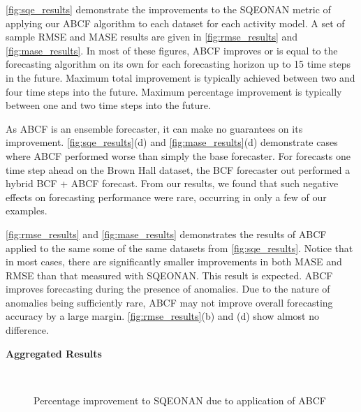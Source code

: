 \ref{fig:sqe_results} demonstrate the improvements to the SQEONAN metric of applying our ABCF algorithm to each dataset for each activity model.  A set of sample RMSE and MASE results are given in \ref{fig:rmse_results} and \ref{fig:mase_results}.  In most of these figures, ABCF improves or is equal to the forecasting algorithm on its own for each forecasting horizon up to 15 time steps in the future.  Maximum total improvement is typically achieved between two and four time steps into the future.  Maximum percentage improvement is typically between one and two time steps into the future.

As ABCF is an ensemble forecaster, it can make no guarantees on its improvement.  \ref{fig:sqe_results}(d) and \ref{fig:mase_results}(d) demonstrate cases where ABCF performed worse than simply the base forecaster.  For forecasts one time step ahead on the Brown Hall dataset, the BCF forecaster out performed a hybrid BCF + ABCF forecast.  From our results, we found that such negative effects on forecasting performance were rare, occurring in only a few of our examples.

\ref{fig:rmse_results} and \ref{fig:mase_results} demonstrates the results of ABCF applied to the same some of the same datasets from \ref{fig:sqe_results}.  Notice that in most cases, there are significantly smaller improvements in both MASE and RMSE than that measured with SQEONAN.  This result is expected.  ABCF improves forecasting during the presence of anomalies.  Due to the nature of anomalies being sufficiently rare, ABCF may not improve overall forecasting accuracy by a large margin.  \ref{fig:rmse_results}(b) and (d) show almost no difference.  

\newpage



\bigskip
\noindent \textbf{Aggregated Results} 

\begin{figure}[!b]
	\begin{center}
		 \\
	\end{center}
	\caption{Percentage improvement to SQEONAN due to application of ABCF}
	\label{fig:sqe_improvement_dataset}
\end{figure}

